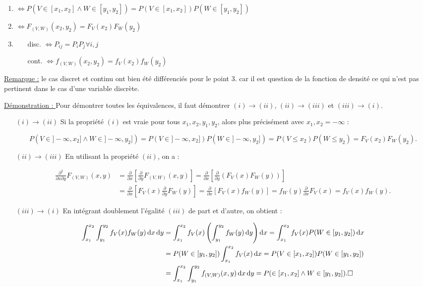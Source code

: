 \documentclass{article}
\renewcommand{\pd}[1]{\frac {\partial}{\partial #1}}
\begin{document}
			\begin{enumerate}
				\item $\iff P(V \in [x_1, x_2] \land W \in [y_1, y_2]) = P(V \in [x_1, x_2])P(W \in [y_1, y_2])$
				\item $\iff F_{(V, W)}(x_2, y_2) = F_V(x_2)F_W(y_2)$
				\item %
				
					  \begin{enumerate}
						\item[disc.] $\iff P_{ij} = P_iP_j \forall i, j$
						\item[cont.] $\iff f_{(V, W)}(x_2, y_2) = f_V(x_2)f_W(y_2)$
					  \end{enumerate}
			\end{enumerate}

			\underline{Remarque :} le cas discret et continu ont bien été différenciés pour le point $3.$ car il est question de la fonction de densité ce qui n'est pas
			pertinent dans le cas d'une variable discrète.

			\underline{Démonstration : } Pour démontrer toutes les équivalences, il faut démontrer $(i) \rightarrow (ii)$, $(ii) \rightarrow (iii)$ et $(iii) \rightarrow (i)$.

			\begin{itemize}
				\item[$(i) \rightarrow (ii)$] Si la propriété $(i)$ est vraie pour tous $x_1, x_2, y_1, y_2$, alors plus précisément avec $x_1, x_2 = -\infty$ :

					  \[P(V \in ]-\infty, x_2] \land W \in ]-\infty, y_2]) = P(V \in ]-\infty, x_2])P(W \in ]-\infty, y_2]) = P(V \leq x_2)P(W \leq y_2) = F_V(x_2)F_W(y_2).\]
				
				\item[$(ii) \rightarrow (iii)$] En utilisant la propriété $(ii)$, on a :

					  \[\begin{aligned}
						\frac {\partial^2}{\partial x \partial y}F_{(V, W)}(x, y) &= \pd{x}\left[\pd{y}F_{(V, W)}(x, y)\right] = \pd{x}\left[\pd{y}\left(F_V(x)F_W(y)\right)\right] \\
						&= \pd{x}\left[F_V(x)\pd{y}F_W(y)\right] = \pd{x}[F_V(x)f_W(y)] = f_W(y)\pd{x}F_V(x) = f_V(x)f_W(y).
					  \end{aligned}\]

				\item[$(iii) \rightarrow (i)$] En intégrant doublement l'égalité $(iii)$ de part et d'autre, on obtient :
				
				\[\begin{aligned}
					\int_{x_1}^{x_2}\int_{y_1}^{y_2}f_V(x)f_W(y)\dif x\dif y &= \int_{x_1}^{x_2}f_V(x)\left(\int_{y_1}^{y_2}f_W(y) \dif y\right)\dif x
						= \int_{x_1}^{x_2}f_V(x)P(W \in [y_1, y_2])\dif x \\
					&= P(W \in [y_1, y_2])\int_{x_1}^{x_2}f_V(x)\dif x = P(V \in [x_1, x_2])P(W \in [y_1, y_2]) \\
					&= \int_{x_1}^{x_2}\int_{y_1}^{y_2}f_{(V, W)}(x, y)\dif x\dif y = P( \in [x_1, x_2] \land W \in [y_1, y_2]). \square
				\end{aligned}\]
			\end{itemize}
\end{document}
